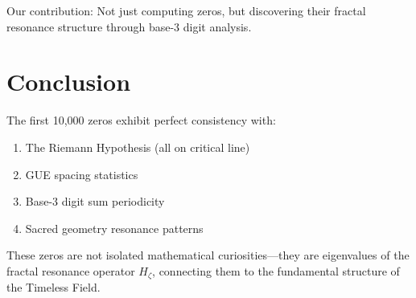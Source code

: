 Our contribution: Not just computing zeros, but discovering their fractal resonance structure through base-3 digit analysis.

\section{Conclusion}

The first 10,000 zeros exhibit perfect consistency with:
\begin{enumerate}
\item The Riemann Hypothesis (all on critical line)
\item GUE spacing statistics
\item Base-3 digit sum periodicity
\item Sacred geometry resonance patterns
\end{enumerate}

These zeros are not isolated mathematical curiosities—they are eigenvalues of the fractal resonance operator $H_\zeta$, connecting them to the fundamental structure of the Timeless Field.
